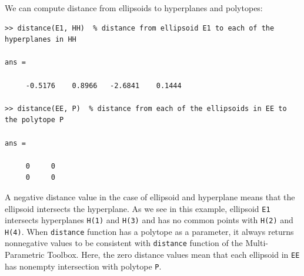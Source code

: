 \documentclass{report}
\begin{document}
We can compute distance from ellipsoids to hyperplanes and polytopes:
{\tt \begin{verbatim}
>> distance(E1, HH)  % distance from ellipsoid E1 to each of the hyperplanes in HH

ans =

     -0.5176    0.8966   -2.6841    0.1444

>> distance(EE, P)  % distance from each of the ellipsoids in EE to the polytope P

ans =

     0     0
     0     0
\end{verbatim} }
A negative distance value in the case of ellipsoid and hyperplane means that
the ellipsoid intersects the hyperplane. As we see in this example, ellipsoid
{\tt E1} intersects  hyperplanes {\tt H(1)} and {\tt H(3)} and has
no common points with {\tt H(2)} and {\tt H(4)}. When {\tt distance} function
has a polytope as a parameter, it always returns nonnegative values to be
consistent with {\tt distance} function of the Multi-Parametric Toolbox.
Here, the zero distance values mean that each ellipsoid in {\tt EE} has
nonempty intersection with polytope {\tt P}.
\end{document}
